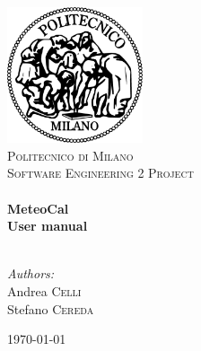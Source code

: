 \begin{titlepage}
\begin{center}

\includegraphics[width=0.30\textwidth]{./images/logo}~\\[1cm]
\textsc{\LARGE Politecnico di Milano}\\[1.5cm]

\textsc{\Large Software Engineering 2 Project}\\[0.5cm]

\HRule \\[0.4cm]
{ \Huge \bfseries MeteoCal \\[0.4cm] }
{ \huge \bfseries User manual \\[0.4cm] }
\HRule \\[1.5cm]

\begin{flushright}
\noindent
\large
\emph{Authors:}\\
Andrea \textsc{Celli}\\
Stefano \textsc{Cereda}
\end{flushright}
\vfill

{\large \today}

\end{center}
\end{titlepage}